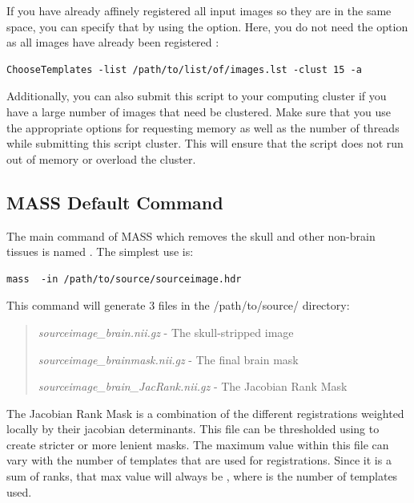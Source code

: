 \documentclass[letterpaper,10pt,english]{sphinxhowto}
\begin{document}
If you have already affinely registered all input images so they are in the same space,
you can specify that by using the  option. Here, you do not need the  option
as all images have already been registered :

\begin{Verbatim}[commandchars=\\\{\}]
ChooseTemplates -list /path/to/list/of/images.lst -clust 15 -a
\end{Verbatim}

Additionally, you can also submit this script to your computing cluster if you have a large number
of images that need be clustered. Make sure that you use the appropriate options for requesting memory
as well as the number of threads while submitting this script cluster. This will ensure that the script
does not run out of memory or overload the cluster.


\subsection{MASS Default Command}
\label{manual:mass-default-command}
The main command of MASS which removes the skull and other non-brain tissues
is named . The simplest use is:

\begin{Verbatim}[commandchars=\\\{\}]
mass  -in /path/to/source/sourceimage.hdr
\end{Verbatim}

This command will generate 3 files in the /path/to/source/ directory:
\begin{quote}

\emph{sourceimage\_brain.nii.gz}              - The skull-stripped image

\emph{sourceimage\_brainmask.nii.gz}          - The final brain mask

\emph{sourceimage\_brain\_JacRank.nii.gz}      - The Jacobian Rank Mask
\end{quote}

The Jacobian Rank Mask is a combination of the different registrations weighted locally by their jacobian
determinants. This file can be thresholded using  to create stricter or more lenient
masks. The maximum value within this file can vary with the number of templates that are used for registrations.
Since it is a sum of ranks, that max value will always be , where  is the number of templates used.
\end{document}

